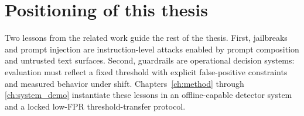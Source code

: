\section{Positioning of this thesis}

Two lessons from the related work guide the rest of the thesis. First, jailbreaks and prompt injection are instruction-level attacks enabled by prompt composition and untrusted text surfaces. Second, guardrails are operational decision systems: evaluation must reflect a fixed threshold with explicit false-positive constraints and measured behavior under shift. Chapters~\ref{ch:method} through \ref{ch:system_demo} instantiate these lessons in an offline-capable detector system and a locked low-FPR threshold-transfer protocol.
